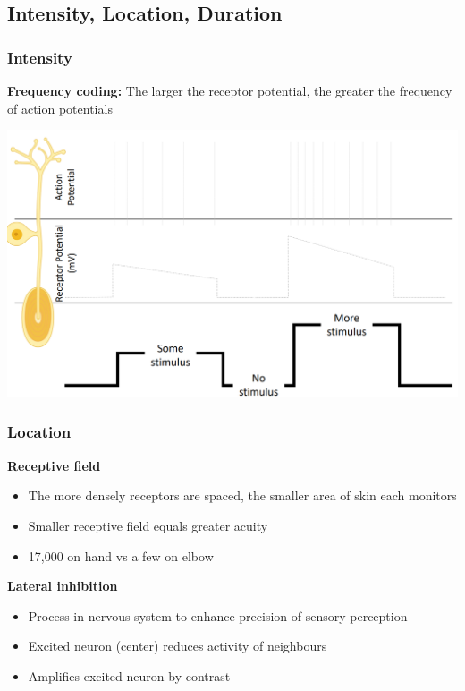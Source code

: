 \documentclass[11pt,fleqn]{book}
\begin{document}
\subsection{Intensity, Location, Duration}
\subsubsection{Intensity}
\textbf{Frequency coding:} The larger the receptor potential, the greater the frequency of action potentials
\begin{center}
    \includegraphics[width=0.65\linewidth]{Pictures/Screenshot 2024-03-06 194015.png}
\end{center}

\subsubsection{Location}
\textbf{Receptive field}
\begin{itemize}
    \item The more densely receptors are spaced, the smaller area of skin each monitors
    \item Smaller receptive field equals greater acuity
    \item 17,000 on hand vs a few on elbow
\end{itemize}
\textbf{Lateral inhibition}
\begin{itemize}
    \item Process in nervous system to enhance precision of sensory perception
    \item Excited neuron (center) reduces activity of neighbours
    \item Amplifies excited neuron by contrast
\end{itemize}
\end{document}
